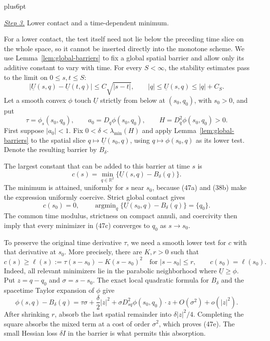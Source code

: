 \documentclass[11pt,reqno]{amsart}
\makeatletter
\theoremstyle{plain}
\theoremstyle{definition}
\theoremstyle{remark}
\renewenvironment{proof}[1][\proofname]{%
  \par
  \pushQED{\qed}%
  \normalfont
  \topsep6pt plus6pt\relax
  \trivlist
  \item[\hskip\labelsep\slshape #1\@addpunct{.}]%
  \ignorespaces
}{%
  \popQED
  \endtrivlist
  \@endpefalse
}
\DeclareRobustCommand{\qed}{%
  \leavevmode\unskip\penalty9999\hbox{}\nobreak
  \ifmmode
    \makebox[0pt][l]{\qquad\hbox{\qedsymbol}}%
  \else
    \qquad\hbox{\qedsymbol}%
  \fi
}
\renewcommand{\qedsymbol}{\rule[.47pt]{4pt}{6pt}}
\numberwithin{equation}{section}
\newcommand{\1}{\mathbf 1}
\makeatother
\begin{document}
\begin{proof}
\smallskip\noindent
\underline{\textit{Step 3.}} Lower contact and a time-dependent minimum.

For a lower contact, the test itself need not lie below the preceding
time slice on the whole space, so it cannot be inserted directly into
the monotone scheme.  We use Lemma~\ref{lem:global-barriers} to fix
a global spatial barrier and allow only its additive constant to vary
with time.  For every $S<\infty$, the stability estimates pass to the
limit on $0\leq s,t\leq S$:
\begin{equation}
|\underline U(s,q)-\underline U(t,q)|
\leq C\sqrt{|s-t|},\qquad
|q|\leq\underline U(s,q)\leq|q|+C_ S.
\tag{47a}
\end{equation}
Let a smooth convex $\phi$ touch $\underline U$ strictly from
below at $(s_ 0,q_ 0)$, with $s_ 0>0$, and put
\begin{equation}
\tau=\phi_ s(s_ 0,q_ 0),\qquad
a_ 0=D_ q\phi(s_ 0,q_ 0),\qquad
H=D_ q^2\phi(s_ 0,q_ 0)>0.
\tag{47b}
\end{equation}
First suppose $|a_ 0|<1$.  Fix
$0<\delta<\lambda_ {\min}(H)$ and apply Lemma~\ref{lem:global-barriers} to the spatial slice
$q\mapsto\underline U(s_ 0,q)$, using
$q\mapsto\phi(s_ 0,q)$ as its lower test.  Denote the resulting
barrier by $B_ \delta$.

The largest constant that can be added to this barrier at time $s$ is
\begin{equation}
c(s)=\min_ {q\in\mathbb R^2}
\{\underline U(s,q)-B_ \delta(q)\}.
\tag{47c}
\end{equation}
The minimum is attained, uniformly for $s$ near $s_ 0$, because
(47a) and (38b) make the expression uniformly coercive.  Strict global
contact gives
\begin{equation}
c(s_ 0)=0,\qquad
\operatorname {argmin}_ q
\{\underline U(s_ 0,q)-B_ \delta(q)\}=\{q_ 0\}.
\tag{47d}
\end{equation}
The common time modulus, strictness on compact annuli, and coercivity
then imply that every minimizer in (47c) converges to $q_ 0$ as
$s\to s_ 0$.

To preserve the original time derivative $\tau$, we need a smooth
lower test for $c$ with that derivative at $s_0$.  More precisely,
there are $K,r>0$ such that
\begin{equation}
c(s)\geq\ell(s):=\tau(s-s_ 0)-K(s-s_ 0)^2
\quad\text{for }|s-s_ 0|\leq r,\qquad c(s_ 0)=\ell(s_ 0).
\tag{47e}
\end{equation}
Indeed, all relevant minimizers lie in the parabolic neighborhood
where $\underline U\geq\phi$.  Put $z=q-q_ 0$ and
$\sigma=s-s_ 0$.  The exact local quadratic formula for $B_ \delta$
and the spacetime Taylor expansion of $\phi$ give
\begin{equation}
\phi(s,q)-B_ \delta(q)
=\tau\sigma+\frac\delta2|z|^2
+\sigma D^2_ {sq}\phi(s_ 0,q_ 0)\cdot z
+O(\sigma^2)+o(|z|^2).
\tag{47f}
\end{equation}
After shrinking $r$, absorb the last spatial remainder into
$\delta|z|^2/4$.  Completing the square absorbs the mixed term at a
cost of order $\sigma^2$, which proves (47e).  The small Hessian loss
$\delta I$ in the barrier is what permits this absorption.


\end{proof}
\end{document}
